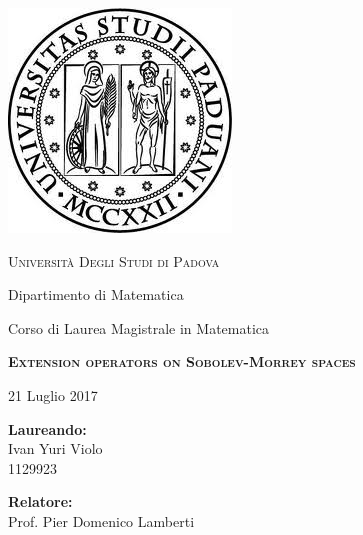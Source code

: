 \documentclass[12pt]{article}
\theoremstyle{definition}
\begin{document}
\thispagestyle{empty}
\begin{center}
	\addtolength{\topmargin}{-3cm}
    \centering

    \includegraphics[width=0.3\linewidth]{unipa.jpg}
    \par
    {\Large {\textsc{Università Degli Studi di Padova} }\par}
\vspace{0.5cm}
    {\Large {{Dipartimento di Matematica} }\par}
    {\Large{ Corso di Laurea Magistrale in Matematica\par}}
    \vspace{2cm}
    {\huge{{ \textbf{\textsc{Extension operators on Sobolev-Morrey spaces}}}} \par}
    \vspace{2.5cm}
    \noindent

\large 21 Luglio 2017\\
\vspace{2cm}
\end{center}
\begin{minipage}[t]{0.47\textwidth}
{\large {\textbf{Laureando:}\\
Ivan Yuri \sc Violo}\\
1129923\\}
\end{minipage}
\hfill
\begin{minipage}[t]{0.65\textwidth}\raggedleft
{\large{ \textbf{Relatore:}\\
Prof. Pier Domenico \sc Lamberti}\\}
\end{minipage}

\cleardoublepage

\tableofcontents


\newpage 
\setcounter{section}{-1}
\end{document}
